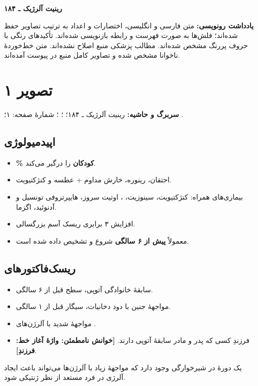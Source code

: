 \documentclass[12pt,a4paper]{article}
\begin{document}
\fi
\begingroup
\providecommand{\ARunclear}[1]{\textbf{[خوانش نامطمئن: #1]}}
\providecommand{\ARrange}[2]{\lr{#1--#2}}
\providecommand{\ARpage}[1]{\clearpage\section*{تصویر #1}\noindent
  \textbf{سربرگ و حاشیه:} ۱۸۴ ـ؛ \lr{Subject:} (خالی)؛ \lr{Date: / /}؛ شمارهٔ صفحه: #1؛ نشان پایین برگه: \lr{YASHA}.\par}

\begin{center}
{\Large\bfseries رینیت آلرژیک ـ ۱۸۴}\par
{}
\end{center}
\textbf{یادداشت رونویسی:} متن فارسی و انگلیسی، اختصارات و اعداد به ترتیب تصاویر حفظ شده‌اند؛ فلش‌ها به صورت فهرست و رابطه بازنویسی شده‌اند. تأکیدهای رنگی با حروف پررنگ مشخص شده‌اند. مطالب پزشکی منبع اصلاح نشده‌اند. متن خط‌خوردهٔ ناخوانا مشخص شده و تصاویر کامل منبع در پیوست آمده‌اند.

\section*{تصویر ۱}
\textbf{سربرگ و حاشیه:} رینیت آلرژیک ـ ۱۸۴؛ ؛ ؛ شمارهٔ صفحه: ۱؛ .
\subsection*{اپیدمیولوژی }
\begin{itemize}
\item \textbf{\ARrange{20}{30}\% کودکان} را درگیر می‌کند.
\item احتقان، رینوره، خارش مداوم + عطسه و کنژکتیویت.
\item بیماری‌های همراه: کنژکتیویت، سینوزیت، ، اوتیت سروز، هایپرتروفی تونسیل و آدنوئید، اگزما.
\item افزایش ۳ برابری ریسک آسم بزرگسالی.
\item معمولاً \textbf{پیش از ۶ سالگی} شروع و تشخیص داده شده است.
\end{itemize}
\subsection*{ریسک‌فاکتورهای }
\begin{itemize}
\item سابقهٔ خانوادگی آتوپی، سطح   قبل از ۶ سالگی.
\item مواجههٔ جنین با دود دخانیات، سیگار قبل از ۱ سالگی.
\item مواجههٔ شدید با آلرژن‌های .
\item فرزندِ کسی که پدر و مادر سابقهٔ آتوپی دارند. \ARunclear{واژهٔ آغاز خط: فرزندِ}.
\end{itemize}
یک دورهٔ در شیرخوارگی وجود دارد که مواجههٔ زیاد با آلرژن‌ها می‌تواند باعث ایجاد آلرژی در فرد مستعد از نظر ژنتیکی شود.
\end{document}

